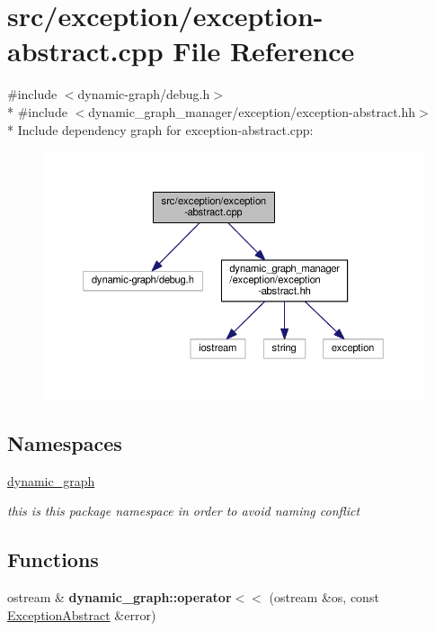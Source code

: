\hypertarget{exception-abstract_8cpp}{}\section{src/exception/exception-\/abstract.cpp File Reference}
\label{exception-abstract_8cpp}
{\ttfamily \#include $<$dynamic-\/graph/debug.\+h$>$}\\*
{\ttfamily \#include $<$dynamic\+\_\+graph\+\_\+manager/exception/exception-\/abstract.\+hh$>$}\\*
Include dependency graph for exception-\/abstract.cpp\+:
\nopagebreak
\begin{figure}[H]
\begin{center}
\leavevmode
\includegraphics[width=350pt]{exception-abstract_8cpp__incl}
\end{center}
\end{figure}
\subsection*{Namespaces}
\begin{DoxyCompactItemize}
\item 
 \hyperlink{namespacedynamic__graph}{dynamic\+\_\+graph}
\begin{DoxyCompactList}\small\item\em this is this package namespace in order to avoid naming conflict \end{DoxyCompactList}\end{DoxyCompactItemize}
\subsection*{Functions}
\begin{DoxyCompactItemize}
\item 
ostream \& {\bfseries dynamic\+\_\+graph\+::operator$<$$<$} (ostream \&os, const \hyperlink{classdynamic__graph_1_1ExceptionAbstract}{Exception\+Abstract} \&error)\hypertarget{namespacedynamic__graph_a44046716acbcd14008a1672f9bb71594}{}\label{namespacedynamic__graph_a44046716acbcd14008a1672f9bb71594}

\end{DoxyCompactItemize}


